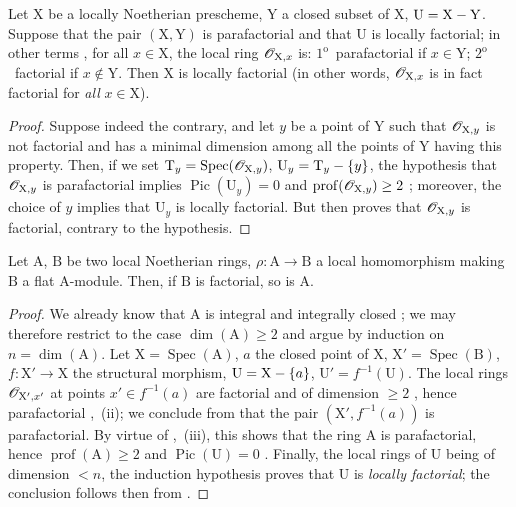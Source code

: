 \begin{corollary}[21.13.11]
\label{IV.21.13.11}
Let $\mathrm{X}$ be a locally Noetherian prescheme, $\mathrm{Y}$ a closed subset of $\mathrm{X}$, $\mathrm{U}=\mathrm{X}-\mathrm{Y}$.
Suppose that the pair $(\mathrm{X},\mathrm{Y})$ is parafactorial and that $\mathrm{U}$ is locally factorial; in other terms , for all $x\in\mathrm{X}$, the local ring $\mathscr{O}_{\mathrm{X},x}$ is:
$1^{\mathrm{o}}$~parafactorial if $x\in\mathrm{Y}$;
$2^{\mathrm{o}}$~factorial if $x\notin\mathrm{Y}$.
Then $\mathrm{X}$ is locally factorial \textup{(in other words, $\mathscr{O}_{\mathrm{X},x}$ is in fact factorial for \emph{all} $x\in\mathrm{X}$)}.
\end{corollary}

\begin{proof}
Suppose indeed the contrary, and let $y$ be a point of $\mathrm{Y}$ such that $\mathscr{O}_{\mathrm{X},y}$ is not factorial and has a minimal dimension among all the points of $\mathrm{Y}$ having this property.
Then, if we set $\mathrm{T}_y=\operatorname{Spec}(\mathscr{O}_{\mathrm{X},y})$, $\mathrm{U}_y=\mathrm{T}_y-\{y\}$, the hypothesis that $\mathscr{O}_{\mathrm{X},y}$ is parafactorial implies $\operatorname{Pic}(\mathrm{U}_y)=0$ and $\operatorname{prof}(\mathscr{O}_{\mathrm{X},y})\geq 2$ ; moreover, the choice of $y$ implies that $\mathrm{U}_y$ is locally factorial.
But then  proves that $\mathscr{O}_{\mathrm{X},y}$ is factorial, contrary to the hypothesis.
\end{proof}

\begin{proposition}[21.13.12]
\label{IV.21.13.12}
Let $\mathrm{A}$, $\mathrm{B}$ be two local Noetherian rings, $\rho:\mathrm{A}\to\mathrm{B}$ a local homomorphism making $\mathrm{B}$ a flat A-module.
Then, if $\mathrm{B}$ is factorial, so is $\mathrm{A}$.
\end{proposition}

\begin{proof}
We already know that $\mathrm{A}$ is integral and integrally closed ; we may therefore restrict to the case $\dim(\mathrm{A})\geq 2$ and argue by induction on $n=\dim(\mathrm{A})$.
Let $\mathrm{X}=\operatorname{Spec}(\mathrm{A})$, $a$ the closed point of $\mathrm{X}$, $\mathrm{X}'=\operatorname{Spec}(\mathrm{B})$, $f:\mathrm{X}'\to\mathrm{X}$ the structural morphism, $\mathrm{U}=\mathrm{X}-\{a\}$, $\mathrm{U}'=f^{-1}(\mathrm{U})$.
The local rings $\mathscr{O}_{\mathrm{X}',x'}$ at points $x'\in f^{-1}(a)$ are factorial and of dimension $\geq 2$ , hence parafactorial ,~(ii); we conclude from  that the pair $(\mathrm{X}',f^{-1}(a))$ is parafactorial.
By virtue of ,~(iii), this shows that the ring $\mathrm{A}$ is parafactorial, hence $\operatorname{prof}(\mathrm{A})\geq 2$ and $\operatorname{Pic}(\mathrm{U})=0$ .
Finally, the local rings of $\mathrm{U}$ being of dimension $<n$, the induction hypothesis proves that $\mathrm{U}$ is \emph{locally factorial}; the conclusion follows then from .
\end{proof}

